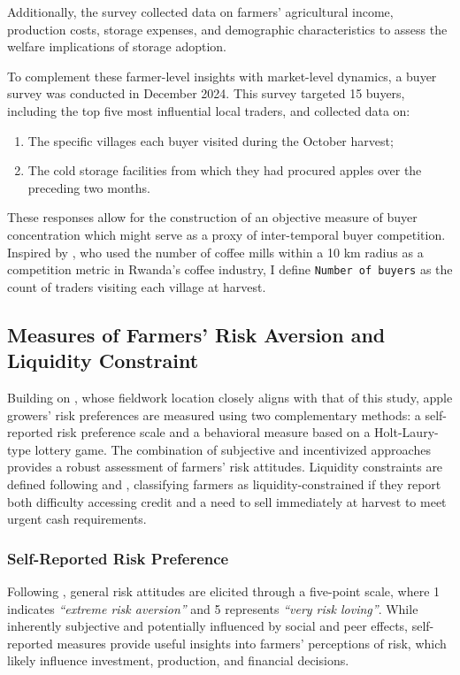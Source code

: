 Additionally, the survey collected data on farmers' agricultural income, production costs, storage expenses, and demographic characteristics to assess the welfare implications of storage adoption.  

To complement these farmer-level insights with market-level dynamics, a buyer survey was conducted in December 2024. This survey targeted 15 buyers, including the top five most influential local traders, and collected data on:
\begin{enumerate}
    \item The specific villages each buyer visited during the October harvest;
    \item The cold storage facilities from which they had procured apples over the preceding two months.
\end{enumerate}
These responses allow for the construction of an objective measure of buyer concentration which might serve as a proxy of inter-temporal buyer competition. Inspired by \cite{macchiavello2021competition}, who used the number of coffee mills within a 10 km radius as a competition metric in Rwanda's coffee industry, I define \texttt{Number of buyers} as the count of traders visiting each village at harvest.  


\subsection{Measures of Farmers' Risk Aversion and Liquidity Constraint}
\noindent Building on \cite{jin2024losses}, whose fieldwork location closely aligns with that of this study, apple growers' risk preferences are measured using two complementary methods: a self-reported risk preference scale and a behavioral measure based on a Holt-Laury-type lottery game. The combination of subjective and incentivized approaches provides a robust assessment of farmers' risk attitudes. Liquidity constraints are defined following \cite{albuquerque2024market} and \cite{stephens2011incomplete}, classifying farmers as liquidity-constrained if they report both difficulty accessing credit and a need to sell immediately at harvest to meet urgent cash requirements.

\subsubsection{Self-Reported Risk Preference}  
\noindent Following \cite{dohmen2011individual}, general risk attitudes are elicited through a five-point scale, where 1 indicates \textit{``extreme risk aversion''} and 5 represents \textit{``very risk loving''}. While inherently subjective and potentially influenced by social and peer effects, self-reported measures provide useful insights into farmers' perceptions of risk, which likely influence investment, production, and financial decisions.  

